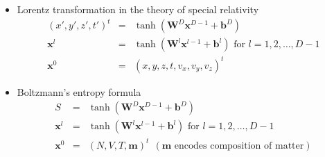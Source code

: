 \documentclass{article}
\newcommand{\bvec}[1]{\mathbf{#1}}
\begin{document}
\begin{itemize}
\item Lorentz transformation in the theory of special relativity
\begin{eqnarray}
(x', y', z', t')^t &=& \tanh(\bvec{W}^D\bvec{x}^{D-1} + \bvec{b}^D)
\nonumber \\
\bvec{x}^l &=& \tanh(\bvec{W}^l\bvec{x}^{l-1} + \bvec{b}^l) 
\text{ for } l=1,2,\dots, D-1
\nonumber \\
\bvec{x}^0 &=& (x, y, z, t, v_x, v_y, v_z)^t
\end{eqnarray}

\item Boltzmann's entropy formula
\begin{eqnarray}
S &=& \tanh(\bvec{W}^D\bvec{x}^{D-1} + \bvec{b}^D)
\nonumber \\
\bvec{x}^l &=& \tanh(\bvec{W}^l\bvec{x}^{l-1} + \bvec{b}^l) 
\text{ for } l=1,2,\dots, D-1
\nonumber \\
\bvec{x}^0 &=& (N, V, T, \bvec{m})^t \ \ (\bvec{m} \text{ encodes composition of matter})
\end{eqnarray}

\end{itemize}
\end{document}
